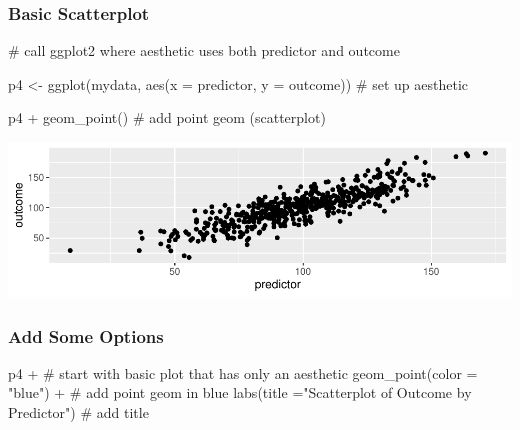 \documentclass[12pt,]{article}
\newenvironment{Shaded}{}{}
\newcommand{\CommentTok}[1]{\textcolor[rgb]{0.00,0.50,0.00}{#1}}
\newcommand{\DataTypeTok}[1]{#1}
\newcommand{\KeywordTok}[1]{\textcolor[rgb]{0.00,0.00,1.00}{#1}}
\newcommand{\NormalTok}[1]{#1}
\newcommand{\OperatorTok}[1]{#1}
\newcommand{\StringTok}[1]{\textcolor[rgb]{0.00,0.50,0.50}{#1}}
\begin{document}
\hypertarget{basic-scatterplot}{%
\subsubsection{Basic Scatterplot}\label{basic-scatterplot}}

\begin{Shaded}
\begin{Highlighting}[]
\CommentTok{# call ggplot2 where aesthetic uses both predictor and outcome}

\NormalTok{p4 <-}\StringTok{ }\KeywordTok{ggplot}\NormalTok{(mydata, }
             \KeywordTok{aes}\NormalTok{(}\DataTypeTok{x =}\NormalTok{ predictor, }
                 \DataTypeTok{y =}\NormalTok{ outcome)) }\CommentTok{# set up aesthetic}

\NormalTok{p4 }\OperatorTok{+}\StringTok{ }\KeywordTok{geom_point}\NormalTok{() }\CommentTok{# add point geom (scatterplot)}
\end{Highlighting}
\end{Shaded}

\includegraphics{introduction-to-ggplot2_files/figure-latex/unnamed-chunk-16-1.pdf}

\hypertarget{add-some-options-1}{%
\subsubsection{Add Some Options}\label{add-some-options-1}}

\begin{Shaded}
\begin{Highlighting}[]
\NormalTok{p4 }\OperatorTok{+}\StringTok{ }\CommentTok{# start with basic plot that has only an aesthetic}
\StringTok{  }\KeywordTok{geom_point}\NormalTok{(}\DataTypeTok{color =} \StringTok{"blue"}\NormalTok{) }\OperatorTok{+}\StringTok{ }\CommentTok{# add point geom in blue}
\StringTok{  }\KeywordTok{labs}\NormalTok{(}\DataTypeTok{title =}\StringTok{"Scatterplot of Outcome by Predictor"}\NormalTok{) }\CommentTok{# add title}
\end{Highlighting}
\end{Shaded}
\end{document}
